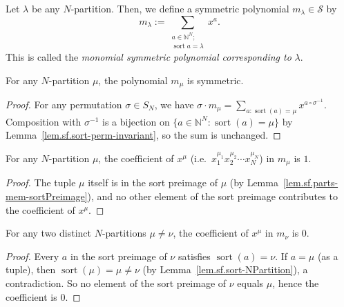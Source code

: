 \begin{definition}
\label{def.sf.m}
\leantarget
\leanok
Let $\lambda$ be any $N$-partition. Then, we define a
symmetric polynomial $m_{\lambda}\in\mathcal{S}$ by%
\[
m_{\lambda}:=\sum_{\substack{a\in\mathbb{N}^{N};\\\operatorname*{sort}%
a=\lambda}}x^{a}.
\]
This is called the \emph{monomial symmetric polynomial corresponding to
}$\lambda$.
\end{definition}

\begin{lemma}
\label{lem.sf.m-symmetric}
\leanhelper
\leanok
For any $N$-partition $\mu$, the polynomial $m_\mu$ is symmetric.
\end{lemma}

\begin{proof}
\leanok
For any permutation $\sigma \in S_N$, we have
$\sigma \cdot m_\mu = \sum_{a : \operatorname{sort}(a) = \mu} x^{a \circ \sigma^{-1}}$.
Composition with $\sigma^{-1}$ is a bijection on
$\{a \in \mathbb{N}^N : \operatorname{sort}(a) = \mu\}$
by Lemma~\ref{lem.sf.sort-perm-invariant}, so the sum is unchanged.
\end{proof}

\begin{lemma}
\label{lem.sf.m-coeff-self}
\leanhelper
\leanok
For any $N$-partition $\mu$, the coefficient of $x^{\mu}$
(i.e.\ $x_1^{\mu_1} x_2^{\mu_2} \cdots x_N^{\mu_N}$) in $m_\mu$ is $1$.
\end{lemma}

\begin{proof}
\leanok
The tuple $\mu$ itself is in the sort preimage of $\mu$ (by Lemma~\ref{lem.sf.parts-mem-sortPreimage}),
and no other element of the sort preimage contributes to the coefficient of $x^\mu$.
\end{proof}

\begin{lemma}
\label{lem.sf.m-coeff-ne}
\leanhelper
\leanok
For any two distinct $N$-partitions $\mu \neq \nu$, the coefficient of
$x^{\mu}$ in $m_\nu$ is $0$.
\end{lemma}

\begin{proof}
\leanok
Every $a$ in the sort preimage of $\nu$ satisfies $\operatorname{sort}(a) = \nu$.
If $a = \mu$ (as a tuple), then $\operatorname{sort}(\mu) = \mu \neq \nu$
(by Lemma~\ref{lem.sf.sort-NPartition}), a contradiction.
So no element of the sort preimage of $\nu$ equals $\mu$, hence the coefficient is $0$.
\end{proof}


